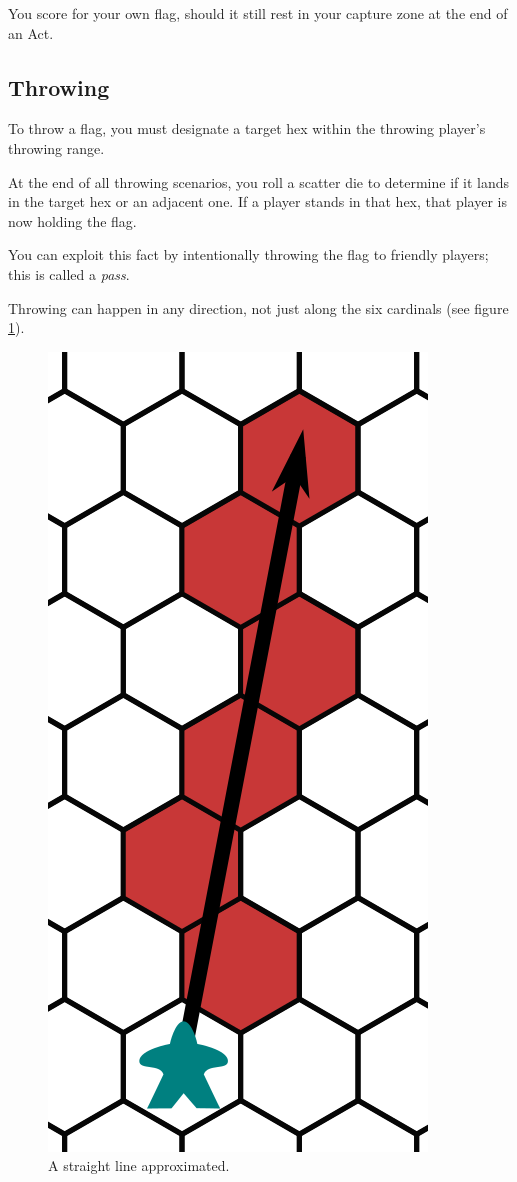 \begin{note}
    You score for your own flag, should it still rest in your capture zone at the end of an Act.
\end{note}

\subsection{Throwing}\label{throwing}
To throw a flag, you must designate a target hex within the throwing player's throwing range.

At the end of all throwing scenarios, you roll a scatter die to determine if it lands in the target hex or an adjacent one. 
If a player stands in that hex, that player is now holding the flag.

You can exploit this fact by intentionally throwing the flag to friendly players; this is called a \textit{pass}.

\begin{note}
    Throwing can happen in any direction, not just along the six cardinals (see figure \ref{fig:line-throw}).
\end{note}

\begin{figure}
    \centering
    \includegraphics{graphics/throwing-cropped.png}
    \caption{A straight line approximated.}
    \label{fig:line-throw}
\end{figure}

